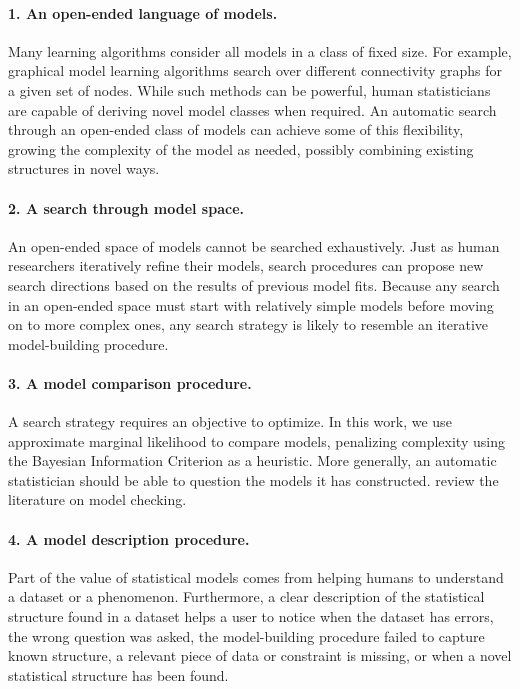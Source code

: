 \paragraph{1. An open-ended language of models.}
Many learning algorithms consider all models in a class of fixed size.
For example, graphical model learning algorithms \citep{Friedman03,Eaton07_uai} search over different connectivity graphs for a given set of nodes.
While such methods can be powerful, human statisticians are capable of deriving novel model classes when required.
An automatic search through an open-ended class of models can achieve some of this flexibility, growing the complexity of the model as needed, possibly combining existing structures in novel ways.

\paragraph{2. A search through model space.}
An open-ended space of models cannot be searched exhaustively.
Just as human researchers iteratively refine their models, search procedures can propose new search directions based on the results of previous model fits.
Because any search in an open-ended space must start with relatively simple models before moving on to more complex ones, any search strategy is likely to resemble an iterative model-building procedure.

\paragraph{3. A model comparison procedure.}
A search strategy requires an objective to optimize.
In this work, we use approximate marginal likelihood to compare models, penalizing complexity using the Bayesian Information Criterion as a heuristic.
More generally, an automatic statistician should be able to question the models it has constructed.
\citet{gelman2012philosophy} review the literature on model checking.

\paragraph{4. A model description procedure.}
Part of the value of statistical models comes from helping humans to understand a dataset or a phenomenon.
Furthermore, a clear description of the statistical structure found in a dataset helps a user to notice when the dataset has errors, the wrong question was asked, the model-building procedure failed to capture known structure, a relevant piece of data or constraint is missing, or when a novel statistical structure has been found.

